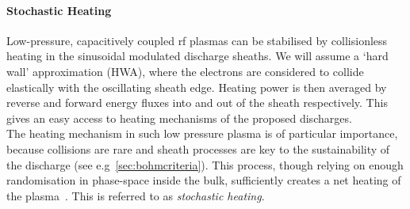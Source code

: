 		\paragraph{Stochastic Heating}
		Low-pressure, capacitively coupled rf plasmas can be stabilised by collisionless heating in the sinusoidal modulated discharge sheaths. We will assume a `hard wall' approximation (HWA), where the electrons are considered to collide elastically with the oscillating sheath edge. Heating power is then averaged by reverse and forward energy fluxes into and out of the sheath respectively. This gives an easy access to heating mechanisms of the proposed discharges.\\
		The heating mechanism in such low pressure plasma is of particular importance, because collisions are rare and sheath processes are key to the sustainability of the discharge (see e.g\@~\autoref{sec:bohmcriteria}). This process, though relying on enough randomisation in phase-space inside the bulk, sufficiently creates a net heating of the plasma~\cite{Gozadinos01b,Goedde88}. This is referred to as \emph{stochastic heating}.\\

